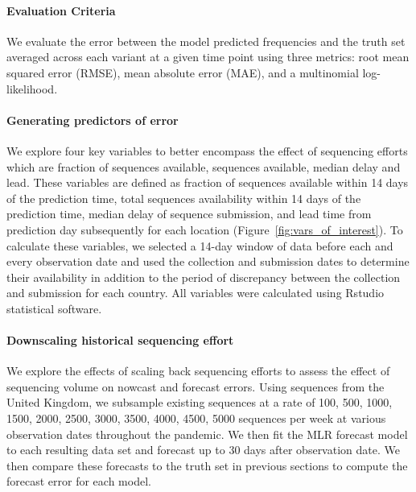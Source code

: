 \documentclass[11pt,oneside,letterpaper]{article}
\begin{document}
\paragraph{Evaluation Criteria}

We evaluate the error between the model predicted frequencies and the truth set averaged across each variant at a given time point using three metrics: root mean squared error (RMSE), mean absolute error (MAE), and a multinomial log-likelihood.

\paragraph{Generating predictors of error}

We explore four key variables to better encompass the effect of sequencing efforts which are fraction of sequences available, sequences available, median delay and lead. 
These variables are defined as fraction of sequences available within 14 days of the prediction time, total sequences availability within 14 days of the prediction time, median delay of sequence submission, and lead time from prediction day subsequently for each location (Figure~\ref{fig:vars_of_interest}).
To calculate these variables, we selected a 14-day window of data before each and every observation date and used the collection and submission dates to determine their availability in addition to the period of discrepancy between the collection and submission for each country.
All variables were calculated using Rstudio statistical software. 



\paragraph{Downscaling historical sequencing effort}

We explore the effects of scaling back sequencing efforts to assess the effect of sequencing volume on nowcast and forecast errors.
Using sequences from the United Kingdom, we subsample existing sequences at a rate of 100, 500, 1000, 1500, 2000, 2500, 3000, 3500, 4000, 4500, 5000 sequences per week at various observation dates throughout the pandemic.
We then fit the MLR forecast model to each resulting data set and forecast up to 30 days after observation date.
We then compare these forecasts to the truth set in previous sections to compute the forecast error for each model.
\end{document}
